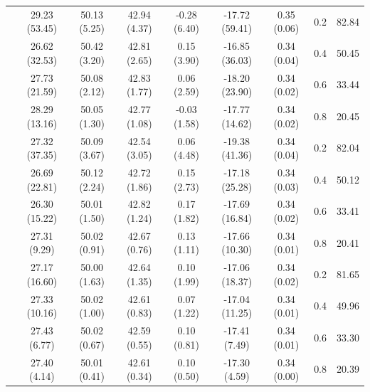 \begin{table}[!h]
{\begin{tabular}[t]{lcccccccc}
 & 29.23 (53.45) & 50.13 (5.25) & 42.94 (4.37) & -0.28 (6.40) & -17.72 (59.41) & 0.35 (0.06) & 0.2 & 82.84\\

 & 26.62 (32.53) & 50.42 (3.20) & 42.81 (2.65) & 0.15 (3.90) & -16.85 (36.03) & 0.34 (0.04) & 0.4 & 50.45\\

 & 27.73 (21.59) & 50.08 (2.12) & 42.83 (1.77) & 0.06 (2.59) & -18.20 (23.90) & 0.34 (0.02) & 0.6 & 33.44\\

\multirow{-4}{*}{\raggedright\arraybackslash 1000} & 28.29 (13.16) & 50.05 (1.30) & 42.77 (1.08) & -0.03 (1.58) & -17.77 (14.62) & 0.34 (0.02) & 0.8 & 20.45\\
\midrule

 & 27.32 (37.35) & 50.09 (3.67) & 42.54 (3.05) & 0.06 (4.48) & -19.38 (41.36) & 0.34 (0.04) & 0.2 & 82.04\\

 & 26.69 (22.81) & 50.12 (2.24) & 42.72 (1.86) & 0.15 (2.73) & -17.18 (25.28) & 0.34 (0.03) & 0.4 & 50.12\\

 & 26.30 (15.22) & 50.01 (1.50) & 42.82 (1.24) & 0.17 (1.82) & -17.69 (16.84) & 0.34 (0.02) & 0.6 & 33.41\\

\multirow{-4}{*}{\raggedright\arraybackslash 2000} & 27.31 (9.29) & 50.02 (0.91) & 42.67 (0.76) & 0.13 (1.11) & -17.66 (10.30) & 0.34 (0.01) & 0.8 & 20.41\\
\midrule

 & 27.17 (16.60) & 50.00 (1.63) & 42.64 (1.35) & 0.10 (1.99) & -17.06 (18.37) & 0.34 (0.02) & 0.2 & 81.65\\

 & 27.33 (10.16) & 50.02 (1.00) & 42.61 (0.83) & 0.07 (1.22) & -17.04 (11.25) & 0.34 (0.01) & 0.4 & 49.96\\

 & 27.43 (6.77) & 50.02 (0.67) & 42.59 (0.55) & 0.10 (0.81) & -17.41 (7.49) & 0.34 (0.01) & 0.6 & 33.30\\

\multirow{-4}{*}{\raggedright\arraybackslash 10000} & 27.40 (4.14) & 50.01 (0.41) & 42.61 (0.34) & 0.10 (0.50) & -17.30 (4.59) & 0.34 (0.00) & 0.8 & 20.39\\
\midrule
\bottomrule
\end{tabular}}
\end{table}
